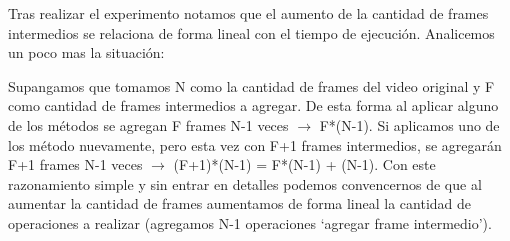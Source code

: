 \begin{figure}[ht]
	\begin{center}
	\end{center}
\end{figure}
\par Tras realizar el experimento notamos que el aumento de la cantidad de frames intermedios se relaciona de forma lineal con el tiempo de ejecuci\'on. Analicemos un poco mas la situaci\'on:

\par Supangamos que tomamos N como la cantidad de frames del video original y F como cantidad de frames intermedios a agregar. De esta forma al aplicar alguno de los m\'etodos se agregan F frames N-1 veces $\longrightarrow$ F*(N-1). Si aplicamos uno de los m\'etodo nuevamente, pero esta vez con F+1 frames intermedios, se agregar\'an F+1 frames N-1 veces $\longrightarrow$ (F+1)*(N-1) = F*(N-1) + (N-1). Con este razonamiento simple y sin entrar en detalles podemos convencernos de que al aumentar la cantidad de frames aumentamos de forma lineal la cantidad de operaciones a realizar (agregamos N-1 operaciones `agregar frame intermedio').